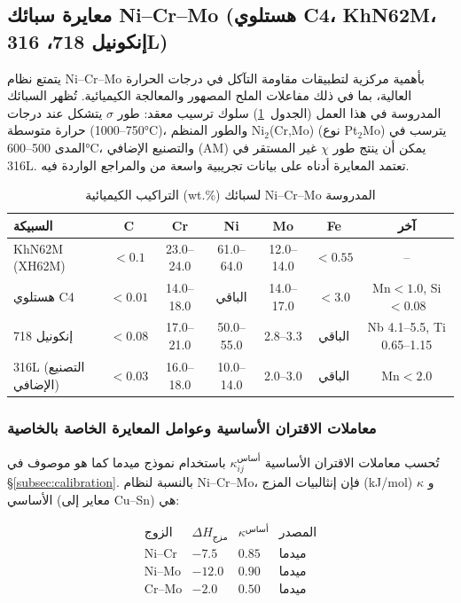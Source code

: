 \documentclass[12pt,a4paper]{article}
\begin{document}
	\subsection{معايرة سبائك Ni–Cr–Mo (هستلوي C4، KhN62M، إنكونيل 718، 316L)}
	\label{subsec:calibration_nicrmo}
	
	يتمتع نظام Ni–Cr–Mo بأهمية مركزية لتطبيقات مقاومة التآكل في درجات الحرارة العالية، بما في ذلك مفاعلات الملح المصهور والمعالجة الكيميائية. تُظهر السبائك المدروسة في هذا العمل (الجدول~\ref{tab:nicrmo_compositions}) سلوك ترسيب معقد: طور \(\sigma\) يتشكل عند درجات حرارة متوسطة (750–1000°C)، والطور المنظم Ni\(_2\)(Cr,Mo) (نوع Pt\(_2\)Mo) يترسب في المدى 500–600°C، والتصنيع الإضافي (AM) يمكن أن ينتج طور \(\chi\) غير المستقر في 316L. تعتمد المعايرة أدناه على بيانات تجريبية واسعة من \cite{dis2025} والمراجع الواردة فيه.
	
	\begin{table}[htbp]
		\centering
		\caption{التراكيب الكيميائية (wt.\%) لسبائك Ni–Cr–Mo المدروسة}
		\label{tab:nicrmo_compositions}
		\begin{tabular}{lcccccc}
			\toprule
			\textbf{السبيكة} & \textbf{C} & \textbf{Cr} & \textbf{Ni} & \textbf{Mo} & \textbf{Fe} & \textbf{آخر} \\
			\midrule
			KhN62M (XH62M) & \(<0.1\) & 23.0–24.0 & 61.0–64.0 & 12.0–14.0 & \(<0.55\) & – \\
			هستلوي C4   & \(<0.01\) & 14.0–18.0 & الباقي & 14.0–17.0 & \(<3.0\) & Mn\(<1.0\), Si\(<0.08\) \\
			إنكونيل 718    & \(<0.08\) & 17.0–21.0 & 50.0–55.0 & 2.8–3.3 & الباقي & Nb 4.1–5.5, Ti 0.65–1.15 \\
			316L (التصنيع الإضافي)      & \(<0.03\) & 16.0–18.0 & 10.0–14.0 & 2.0–3.0 & الباقي & Mn\(<2.0\) \\
			\bottomrule
		\end{tabular}
	\end{table}
	
	\subsubsection{معاملات الاقتران الأساسية وعوامل المعايرة الخاصة بالخاصية}
	تُحسب معاملات الاقتران الأساسية \(\kappa_{ij}^{\text{أساس}}\) باستخدام نموذج ميدما كما هو موصوف في \S\ref{subsec:calibration}. بالنسبة لنظام Ni–Cr–Mo، فإن إنثالبيات المزج (kJ/mol) و \(\kappa\) الأساسي (معاير إلى Cu–Sn) هي:
	
	\[
	\begin{array}{lccc}
		\text{الزوج} & \Delta H_{\text{مزج}} & \kappa^{\text{أساس}} & \text{المصدر} \\
		\hline
		\text{Ni–Cr} & -7.5 & 0.85 & \text{ميدما} \\
		\text{Ni–Mo} & -12.0 & 0.90 & \text{ميدما} \\
		\text{Cr–Mo} & -2.0 & 0.50 & \text{ميدما}
	\end{array}
	\]
	
\end{document}
